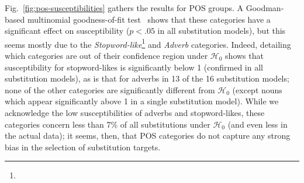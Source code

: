 \medskip

\begin{new}

Fig.~\ref{fig:pos-susceptibilities} gathers the results for POS groups.
A Goodman-based multinomial goodness-of-fit test~\citep{goodman_simultaneous_1965} shows that these categories have a significant effect on susceptibility ($p < .05$ in all substitution models), but this seems mostly due to the \emph{Stopword-like}\footnote{
}
and \emph{Adverb} categories.
Indeed, detailing which categories are out of their confidence region under $\mathcal{H}_0$ shows that susceptibility for stopword-likes is significantly below 1 (confirmed in all substitution models), as is that for adverbs in 13 of the 16 substitution models;
none of the other categories are significantly different from $\mathcal{H}_0$ (except nouns which appear significantly above 1 in a single substitution model).
While we acknowledge the low susceptibilities of adverbs and stopword-likes, these categories concern less than 7\% of all substitutions under $\mathcal{H}_0$ (and even less in the actual data);
it seems, then, that POS categories do not capture any strong bias in the selection of substitution targets.

\end{new}

